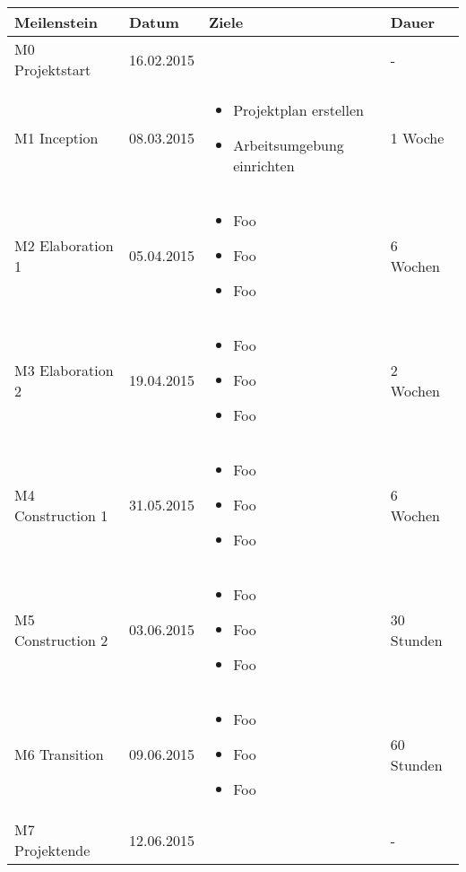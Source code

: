 \begin{tabular}[t]{|l|l|p{6.5cm}|l|}\hline
\textbf{Meilenstein} & \textbf{Datum} & \textbf{Ziele} & \textbf{Dauer} \\ \hline \hline
M0 Projektstart & 16.02.2015 & & - \\ \hline
M1 Inception & 08.03.2015 &
  \begin{itemize}
    \item Projektplan erstellen
    \item Arbeitsumgebung einrichten
  \end{itemize} & 1 Woche \\ \hline
M2 Elaboration 1 & 05.04.2015 &
  \begin{itemize}
    \item Foo
    \item Foo
    \item Foo
  \end{itemize} & 6 Wochen \\ \hline
M3 Elaboration 2 & 19.04.2015 &
  \begin{itemize}
    \item Foo
    \item Foo
    \item Foo
  \end{itemize} & 2 Wochen \\ \hline
M4 Construction 1 & 31.05.2015 &
  \begin{itemize}
    \item Foo
    \item Foo
    \item Foo
  \end{itemize} & 6 Wochen \\ \hline
M5 Construction 2 & 03.06.2015 &
  \begin{itemize}
    \item Foo
    \item Foo
    \item Foo
  \end{itemize} & 30 Stunden \\ \hline
M6 Transition & 09.06.2015 &
  \begin{itemize}
    \item Foo
    \item Foo
    \item Foo
  \end{itemize} & 60 Stunden \\ \hline
M7 Projektende & 12.06.2015 & & - \\ \hline

\end{tabular}

